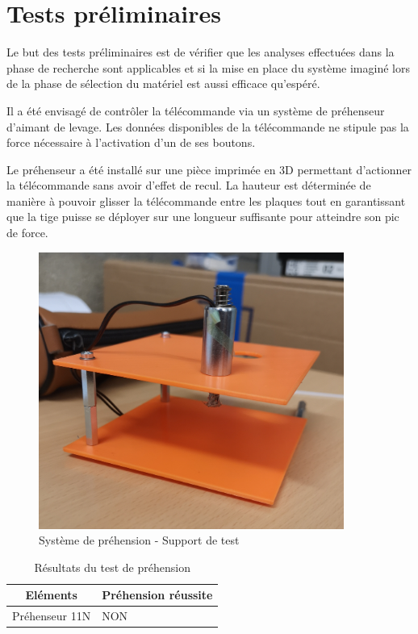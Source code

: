 \section{Tests préliminaires \label{aimant}}
Le but des tests préliminaires est de vérifier que les analyses effectuées dans la phase de recherche sont applicables et si la mise en
place du système imaginé lors de la phase de sélection du matériel est aussi efficace qu'espéré.

Il a été envisagé de contrôler la télécommande via un système de préhenseur d'aimant de levage. Les données disponibles de la télécommande
ne stipule pas la force nécessaire à l'activation d'un de ses boutons.

Le préhenseur a été installé sur une pièce imprimée en 3D permettant d'actionner la télécommande sans avoir d'effet de recul.
La hauteur est déterminée de manière à pouvoir glisser la télécommande entre les plaques tout en garantissant que la tige puisse se déployer sur
une longueur suffisante pour atteindre son pic de force.

\begin{figure}[H]
    \centering
    \includegraphics[width=10cm]{assets/figures/support_test_prehenseur.jpg}
    \caption{Système de préhension - Support de test}
\end{figure}

\begin{table}[h]
    \begin{center}
        \caption{Résultats du test de préhension}
        \begin{tabular}{|c|l|}
            Eléments       & Préhension réussite \\ \hline
            Préhenseur 11N & NON                 \\
        \end{tabular}
    \end{center}
\end{table}

